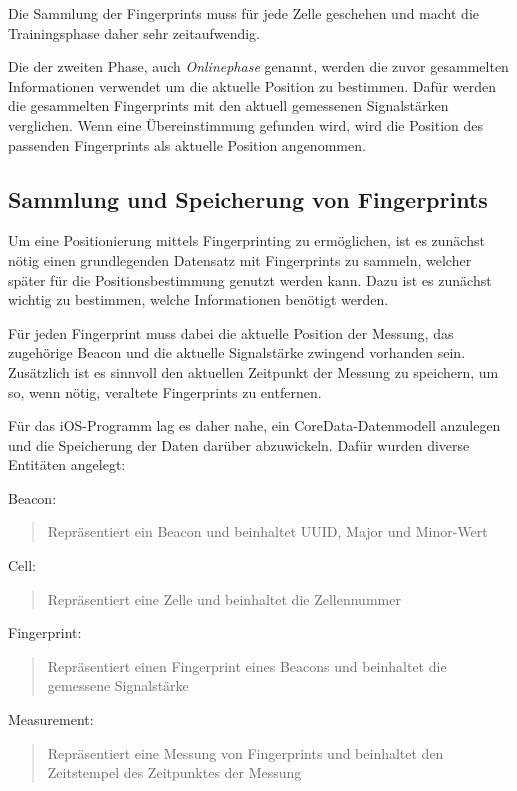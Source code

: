 Die Sammlung der Fingerprints muss für jede Zelle geschehen und macht die Trainingsphase daher sehr zeitaufwendig. 

Die der zweiten Phase, auch \emph{Onlinephase} genannt, werden die zuvor gesammelten Informationen verwendet um die aktuelle Position zu bestimmen. 
Dafür werden die gesammelten Fingerprints mit den aktuell gemessenen Signalstärken verglichen. Wenn eine Übereinstimmung gefunden wird, wird die Position des passenden Fingerprints als aktuelle Position angenommen.


\subsection{Sammlung und Speicherung von Fingerprints}
\label{sec:implementation:fingerprinting:collecting}
Um eine Positionierung mittels Fingerprinting zu ermöglichen, ist es zunächst nötig einen grundlegenden Datensatz mit Fingerprints zu sammeln, welcher später für die Positionsbestimmung genutzt werden kann. Dazu ist es zunächst wichtig zu bestimmen, welche Informationen benötigt werden.

Für jeden Fingerprint muss dabei die aktuelle Position der Messung, das zugehörige Beacon und die aktuelle Signalstärke zwingend vorhanden sein.
Zusätzlich ist es sinnvoll den aktuellen Zeitpunkt der Messung zu speichern, um so, wenn nötig, veraltete Fingerprints zu entfernen. 

Für das iOS-Programm lag es daher nahe, ein CoreData-Datenmodell anzulegen und die Speicherung der Daten darüber abzuwickeln.
Dafür wurden diverse Entitäten angelegt:

Beacon:
	\begin{quote}Repräsentiert ein Beacon und beinhaltet UUID, Major und Minor-Wert\end{quote}
Cell:
	\begin{quote}Repräsentiert eine Zelle und beinhaltet die Zellennummer\end{quote}
Fingerprint:
	\begin{quote}Repräsentiert einen Fingerprint eines Beacons und beinhaltet die gemessene Signalstärke\end{quote}
Measurement:
	\begin{quote}Repräsentiert eine Messung von Fingerprints und beinhaltet den Zeitstempel des Zeitpunktes der Messung\end{quote}

